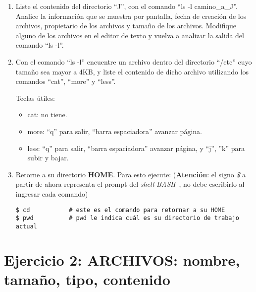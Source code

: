 \documentclass[12pt]{article}
\newcommand{\bash}{\emph{BASH}\ }
\begin{document}
\begin{enumerate}
    \item Liste el contenido del directorio ``J'', con el comando ``ls -l
        camino\_a\_J''.
        Analice la información que se muestra por pantalla, fecha de creación
        de los archivos, propietario de los
        archivos y tamaño de los archivos. Modifique alguno de los archivos en
        el editor de texto y vuelva a
        analizar la salida del comando ``ls -l''.

    \item Con el comando ``ls -l'' encuentre un archivo dentro del directorio
        ``/etc'' cuyo tamaño sea mayor a 4KB, y liste
        el contenido de dicho archivo utilizando los comandos ``cat'', ``more'' y
        ``less''.

    Teclas útiles:

    \begin{itemize}

        \itemsep2pt \parskip0pt 

        \item cat: no tiene.

        \item more: ``q'' para salir, ``barra espaciadora'' avanzar página.

        \item less: ``q'' para salir, ``barra espaciadora'' avanzar página, y
            ``j'', ''k'' para subir y bajar.

    \end{itemize}

    \item Retorne a su directorio \textbf{HOME}. Para esto ejecute:
        (\textbf{Atención}: el signo \emph{\$} a partir de ahora representa el
        prompt del \emph{shell} \bash, no debe escribirlo al ingresar cada
        comando)

        \begin{verbatim}
$ cd           # este es el comando para retornar a su HOME
$ pwd          # pwd le indica cuál es su directorio de trabajo actual
        \end{verbatim}

\end{enumerate}

\section{Ejercicio 2: ARCHIVOS: nombre, tamaño, tipo, contenido}
\end{document}
